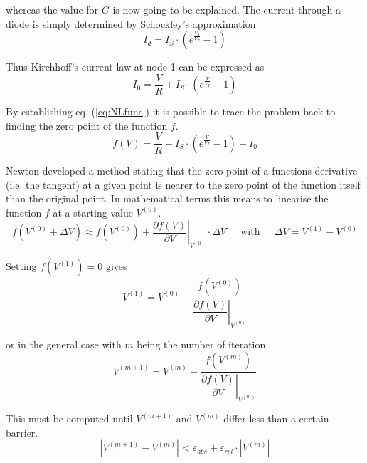 whereas the value for $G$ is now going to be explained.  The current
through a diode is simply determined by Schockley's approximation
\begin{equation}
I_{d} = I_{S}\cdot \left(e^{\frac{V_{d}}{V_{T}}} - 1\right)
\end{equation}

Thus Kirchhoff's current law at node 1 can be expressed as
\begin{equation}
I_{0} = \dfrac{V}{R} + I_{S}\cdot \left(e^{\frac{V}{V_{T}}} - 1\right)
\end{equation}

By establishing eq. (\ref{eq:NLfunc}) it is possible to trace the
problem back to finding the zero point of the function $f$.
\begin{equation}
f(V) = \dfrac{V}{R} + I_{S}\cdot \left(e^{\frac{V}{V_{T}}} - 1\right) - I_{0}
\label{eq:NLfunc}
\end{equation}

Newton developed a method stating that the zero point of a functions
derivative (i.e. the tangent) at a given point is nearer to the zero
point of the function itself than the original point.  In mathematical
terms this means to linearise the function $f$ at a starting value
$V^{(0)}$.
\begin{equation}
f\left(V^{(0)} + \Delta V\right) \approx f\left(V^{(0)}\right) + \left.\dfrac{\partial f\left(V\right)}{\partial V}\right|_{V^{(0)}}\cdot \Delta V
\;\;\;\; \text{ with } \;\;\;\;
\Delta V = V^{(1)} - V^{(0)}
\label{eq:NRapprox}
\end{equation}

Setting $f(V^{(1)}) = 0$ gives
\begin{equation}
V^{(1)} = V^{(0)} - \dfrac{f\left(V^{(0)}\right)}{\left.\dfrac{\partial f\left(V\right)}{\partial V}\right|_{V^{(0)}}}
\end{equation}

or in the general case with $m$ being the number of iteration
\begin{equation}
V^{(m + 1)} = V^{(m)} - \dfrac{f\left(V^{(m)}\right)}{\left.\dfrac{\partial f\left(V\right)}{\partial V}\right|_{V^{(m)}}}
\label{eq:NRgeneral}
\end{equation}

This must be computed until $V^{(m+1)}$ and $V^{(m)}$ differ less than a
certain barrier.
\begin{equation}
\left|V^{(m+1)} - V^{(m)}\right| < \varepsilon_{abs} + \varepsilon_{rel}\cdot \left|V^{(m)}\right|
\label{eq:NLconvergence}
\end{equation}

